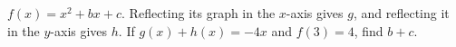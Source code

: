 $f(x)=x^2+bx+c$. Reflecting its graph in the $x$-axis gives $g$, and reflecting it in the $y$-axis gives $h$. If $g(x)+h(x)=-4x$ and $f(3)=4$, find $b+c$.
